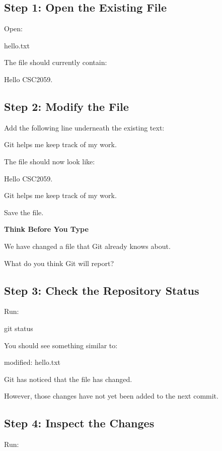 \documentclass{csc2059practical}
\begin{document}
\subsection{Step 1: Open the Existing File}
Open:

\begin{terminalplain}
hello.txt
\end{terminalplain}
The file should currently contain:

\begin{terminalplain}
Hello CSC2059.
\end{terminalplain}
\subsection{Step 2: Modify the File}
Add the following line underneath the existing text:
\begin{terminalplain}
  Git helps me keep track of my work.
\end{terminalplain}

The file should now look like:

\begin{terminalplain}
Hello CSC2059.

Git helps me keep track of my work.
\end{terminalplain}

Save the file.

\begin{reflectionbox}
\textbf{Think Before You Type}\par
\medskip
We have changed a file that Git already knows about.

What do you think Git will report?
\end{reflectionbox}
\subsection{Step 3: Check the Repository Status}
Run:

\begin{terminalplain}
git status
\end{terminalplain}
You should see something similar to:

\begin{terminalplain}
\textcolor{GitRed}{modified: hello.txt}
\end{terminalplain}
Git has noticed that the file has changed.

However, those changes have not yet been added to the next commit.

\subsection{Step 4: Inspect the Changes}
Run:
\end{document}
